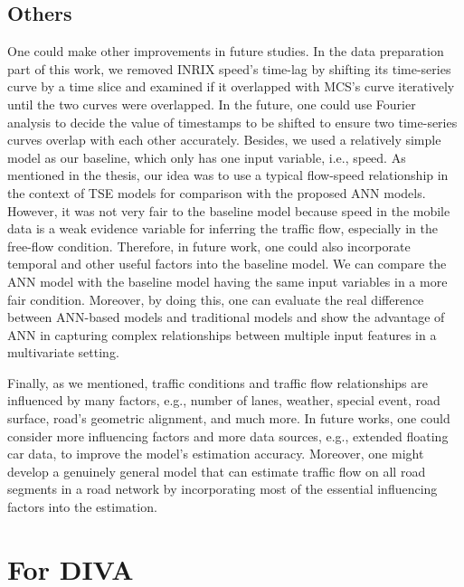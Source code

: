 \documentclass[english]{kththesis}
\begin{document}
\subsection{Others}
One could make other improvements in future studies. In the data preparation part of this work, we removed INRIX speed's time-lag by shifting its time-series curve by a time slice and examined if it overlapped with MCS's curve iteratively until the two curves were overlapped. In the future, one could use Fourier analysis to decide the value of timestamps to be shifted to ensure two time-series curves overlap with each other accurately. Besides, we used a relatively simple model as our baseline, which only has one input variable, i.e., speed. As mentioned in the thesis, our idea was to use a typical flow-speed relationship in the context of TSE models for comparison with the proposed ANN models. However, it was not very fair to the baseline model because speed in the mobile data is a weak evidence variable for inferring the traffic flow, especially in the free-flow condition. Therefore, in future work, one could also incorporate temporal and other useful factors into the baseline model. We can compare the ANN model with the baseline model having the same input variables in a more fair condition. Moreover, by doing this, one can evaluate the real difference between ANN-based models and traditional models and show the advantage of ANN in capturing complex relationships between multiple input features in a multivariate setting.

Finally, as we mentioned, traffic conditions and traffic flow relationships are influenced by many factors, e.g., number of lanes, weather, special event, road surface, road's geometric alignment, and much more. In future works, one could consider more influencing factors and more data sources, e.g., extended floating car data, to improve the model's estimation accuracy. Moreover, one might develop a genuinely general model that can estimate traffic flow on all road segments in a road network by incorporating most of the essential influencing factors into the estimation.

\cleardoublepage


\renewcommand{\bibname}{References}



\cleardoublepage

\label{pg:lastPageofMainmatter}

\clearpage
\section*{For DIVA}
\end{document}
